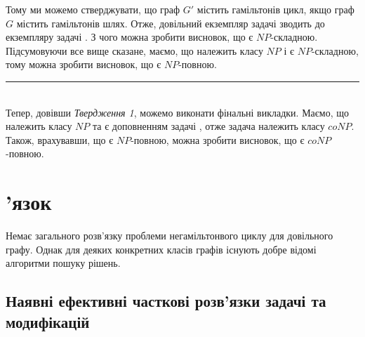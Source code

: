 \documentclass[14pt]{article}
\begin{document}
\begin{spacing}{1.175}
\begin{center}
        \end{center}
        
        \begin{center}
        \end{center}
        \newpage

        \quad Тому ми можемо стверджувати, що граф \(G'\) містить гамільтонів цикл, якщо граф \(G\) містить гамільтонів шлях. Отже, довільний екземпляр задачі \hamcycle зводить до екземпляру задачі \dhampath. З чого можна зробити висновок, що \hamcycle є \(NP\)-складною.\\
        
        \quad Підсумовуючи все вище сказане, маємо, що \hamcycle належить класу \(NP\) і є \(NP\)-складною, тому можна зробити висновок, що \hamcycle є \(NP\)-повною.

        
    \hspace{15cm} \rule{0.7em}{0.7em}
    
    \\
    \quad Тепер, довівши \textit{Твердження 1}, можемо виконати фінальні викладки. Маємо, що \hamcycle належить класу \(NP\) та \nonhamcycle є доповненням задачі \hamcycle, отже задача \nonhamcycle належить класу \(coNP\). Також, врахувавши, що \hamcycle є \(NP\)-повною, можна зробити висновок, що \nonhamcycle є  \(coNP\)-повною.
        

    \section{'язок}
    \qquad Немає загального розв’язку проблеми негамільтонвого циклу для довільного графу. Однак для деяких конкретних класів графів існують добре відомі алгоритми пошуку рішень.
    
        \subsection{\normalfont Наявні ефективні часткові розв'язки задачі та модифікацій}

\end{spacing}
\end{document}

